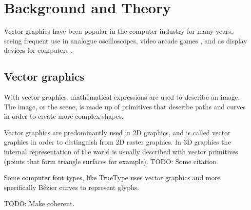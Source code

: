 \chapter{Background and Theory}

Vector graphics have been popular in the computer industry for many years, seeing frequent use in analogue oscilloscopes, video arcade games \cite{astroids}, and as display devices for computers \cite{ibm2250}.

\section{Vector graphics}

With vector graphics, mathematical expressions are used to describe an image.
The image, or the scene, is made up of primitives that describe paths and curves in order to create more complex shapes.

Vector graphics are predominantly used in 2D graphics, and is called vector graphics in order to distinguish from 2D raster graphics. In 3D graphics the internal representation of the world is usually described with vector primitives (points that form triangle surfaces for example). TODO: Some citation.

Some computer font types, like TrueType uses vector graphics and more specifically Bézier curves to represent glyphs\cite{truetype}.


TODO: Make coherent.
